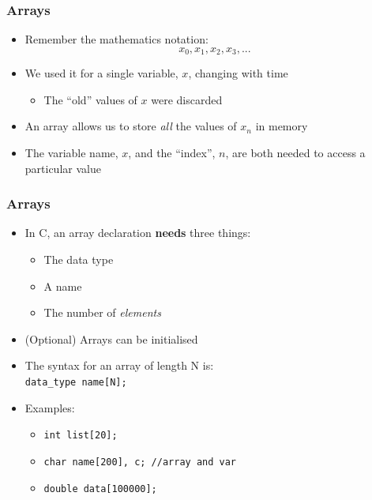 \documentclass[14pt]{beamer}
\begin{document}
\begin{frame}
\frametitle{Arrays}
\begin{itemize}
\item Remember the mathematics notation:
\begin{equation*}
x_0, x_1, x_2, x_3, ...
\end{equation*}
\item We used it for a single variable, $x$, changing with time
	\begin{itemize}
		\item The ``old'' values of $x$ were discarded
	\end{itemize}
\pause
\item An array allows us to store \textit{all} the values of $x_n$ in memory
\item The variable name, $x$, and the ``index'', $n$, are both needed to access a particular value
\end{itemize}
\end{frame}

\begin{frame}
\frametitle{Arrays}
\begin{itemize}
\item In C, an array declaration \textbf{needs} three things:
	\begin{itemize}
		\item The data type
		\item A name
		\item The number of \textit{elements}
	\end{itemize}
\item (Optional) Arrays can be initialised
\item The syntax for an array of length N is:\\
\texttt{data\_type name[N];}
\item Examples:
	\begin{itemize}
		\item \texttt{int list[20];}
		\item \texttt{char name[200], c; //array and var}
		\item \texttt{double data[100000];}
	\end{itemize}
\end{itemize}
\end{frame}
\end{document}
